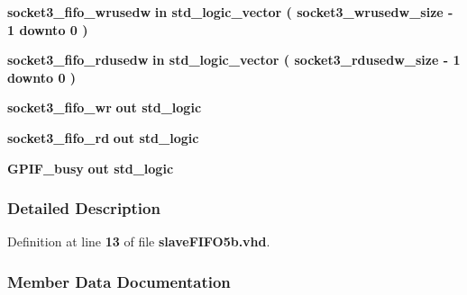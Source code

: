 \begin{DoxyCompactItemize}
\item 
{\bf socket3\+\_\+fifo\+\_\+wrusedw}  {\bfseries {\bfseries \textcolor{keywordflow}{in}\textcolor{vhdlchar}{ }}} {\bfseries \textcolor{comment}{std\+\_\+logic\+\_\+vector}\textcolor{vhdlchar}{ }\textcolor{vhdlchar}{(}\textcolor{vhdlchar}{ }\textcolor{vhdlchar}{ }\textcolor{vhdlchar}{ }\textcolor{vhdlchar}{ }{\bfseries {\bf socket3\+\_\+wrusedw\+\_\+size}} \textcolor{vhdlchar}{-\/}\textcolor{vhdlchar}{ } \textcolor{vhdldigit}{1} \textcolor{vhdlchar}{ }\textcolor{keywordflow}{downto}\textcolor{vhdlchar}{ }\textcolor{vhdlchar}{ } \textcolor{vhdldigit}{0} \textcolor{vhdlchar}{ }\textcolor{vhdlchar}{)}\textcolor{vhdlchar}{ }} 
\item 
{\bf socket3\+\_\+fifo\+\_\+rdusedw}  {\bfseries {\bfseries \textcolor{keywordflow}{in}\textcolor{vhdlchar}{ }}} {\bfseries \textcolor{comment}{std\+\_\+logic\+\_\+vector}\textcolor{vhdlchar}{ }\textcolor{vhdlchar}{(}\textcolor{vhdlchar}{ }\textcolor{vhdlchar}{ }\textcolor{vhdlchar}{ }\textcolor{vhdlchar}{ }{\bfseries {\bf socket3\+\_\+rdusedw\+\_\+size}} \textcolor{vhdlchar}{-\/}\textcolor{vhdlchar}{ } \textcolor{vhdldigit}{1} \textcolor{vhdlchar}{ }\textcolor{keywordflow}{downto}\textcolor{vhdlchar}{ }\textcolor{vhdlchar}{ } \textcolor{vhdldigit}{0} \textcolor{vhdlchar}{ }\textcolor{vhdlchar}{)}\textcolor{vhdlchar}{ }} 
\item 
{\bf socket3\+\_\+fifo\+\_\+wr}  {\bfseries {\bfseries \textcolor{keywordflow}{out}\textcolor{vhdlchar}{ }}} {\bfseries \textcolor{comment}{std\+\_\+logic}\textcolor{vhdlchar}{ }} 
\item 
{\bf socket3\+\_\+fifo\+\_\+rd}  {\bfseries {\bfseries \textcolor{keywordflow}{out}\textcolor{vhdlchar}{ }}} {\bfseries \textcolor{comment}{std\+\_\+logic}\textcolor{vhdlchar}{ }} 
\item 
{\bf G\+P\+I\+F\+\_\+busy}  {\bfseries {\bfseries \textcolor{keywordflow}{out}\textcolor{vhdlchar}{ }}} {\bfseries \textcolor{comment}{std\+\_\+logic}\textcolor{vhdlchar}{ }} 
\end{DoxyCompactItemize}


\subsubsection{Detailed Description}


Definition at line {\bf 13} of file {\bf slave\+F\+I\+F\+O5b.\+vhd}.



\subsubsection{Member Data Documentation}
